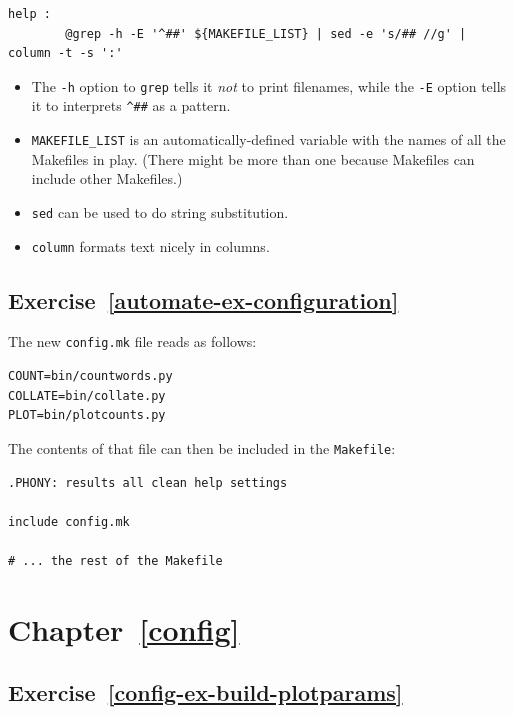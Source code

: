 \documentclass[
]{krantz}
\begin{document}
\begin{verbatim}
help :
        @grep -h -E '^##' ${MAKEFILE_LIST} | sed -e 's/## //g' | column -t -s ':'
\end{verbatim}

\begin{itemize}
\item
  The \texttt{-h} option to \texttt{grep} tells it \emph{not} to print filenames,
  while the \texttt{-E} option tells it to interprets \texttt{\^{}\#\#} as a pattern.
\item
  \texttt{MAKEFILE\_LIST} is an automatically-defined variable
  with the names of all the Makefiles in play.
  (There might be more than one because Makefiles can include other Makefiles.)
\item
  \texttt{sed} can be used to do string substitution.
\item
  \texttt{column} formats text nicely in columns.
\end{itemize}

\hypertarget{exercise-refautomate-ex-configuration}{%
\subsection*{Exercise~\ref{automate-ex-configuration}}\label{exercise-refautomate-ex-configuration}}


The new \texttt{config.mk} file reads as follows:

\begin{verbatim}
COUNT=bin/countwords.py
COLLATE=bin/collate.py
PLOT=bin/plotcounts.py
\end{verbatim}

The contents of that file can then be included in the \texttt{Makefile}:

\begin{verbatim}
.PHONY: results all clean help settings

include config.mk

# ... the rest of the Makefile
\end{verbatim}

\hypertarget{chapter-refconfig}{%
\section*{Chapter~\ref{config}}\label{chapter-refconfig}}

\hypertarget{exercise-refconfig-ex-build-plotparams}{%
\subsection*{Exercise~\ref{config-ex-build-plotparams}}\label{exercise-refconfig-ex-build-plotparams}}
\end{document}
